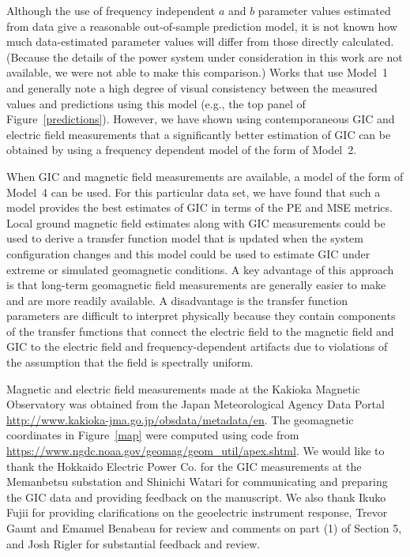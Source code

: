 \documentclass[draft,linenumbers]{agujournal2018}
\begin{document}
Although the use of frequency independent $a$ and $b$ parameter values estimated from data give a reasonable out-of-sample prediction model, it is not known how much data-estimated parameter values will differ from those directly calculated. (Because the details of the power system under consideration in this work are not available, we were not able to make this comparison.) Works that use Model~1 and generally note a high degree of visual consistency between the measured values and predictions using this model (e.g., the top panel of Figure~\ref{predictions}). However, we have shown using contemporaneous GIC and electric field measurements that a significantly better estimation of GIC can be obtained by using a frequency dependent model of the form of Model~2. 


When GIC and magnetic field measurements are available, a model of the form of Model~4 can be used. For this particular data set, we have found that such a model provides the best estimates of GIC in terms of the PE and MSE metrics. Local ground magnetic field estimates along with GIC measurements could be used to derive a transfer function model that is updated when the system configuration changes and this model could be used to estimate GIC under extreme or simulated geomagnetic conditions. A key advantage of this approach is that long-term geomagnetic field measurements are generally easier to make and are more readily available. A disadvantage is the transfer function parameters are difficult to interpret physically because they contain components of the transfer functions that connect the electric field to the magnetic field and GIC to the electric field and frequency-dependent artifacts due to violations of the assumption that the field is spectrally uniform.

\acknowledgments
Magnetic and electric field measurements made at the Kakioka Magnetic Observatory was obtained from the Japan Meteorological Agency Data Portal \url{http://www.kakioka-jma.go.jp/obsdata/metadata/en}. The geomagnetic coordinates in Figure~\ref{map} were computed using code from \url{https://www.ngdc.noaa.gov/geomag/geom_util/apex.shtml}. We would like to thank the Hokkaido Electric Power Co. for the GIC measurements at the Memanbetsu substation and Shinichi Watari for communicating and preparing the GIC data and providing feedback on the manuscript. We also thank Ikuko Fujii for providing clarifications on the geoelectric instrument response, Trevor Gaunt and Emanuel Benabeau for review and comments on part (1) of Section 5, and Josh Rigler for substantial feedback and review.
\end{document}
